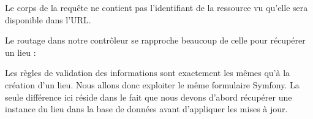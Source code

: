 \documentclass[big]{zmdocument}
\begin{document}
\begin{Error}
Le corps de la requête ne contient pas l'identifiant de la ressource vu qu'elle sera disponible dans l'URL.
\end{Error}


Le routage dans notre contrôleur se rapproche beaucoup de celle pour récupérer un lieu :






Les règles de validation des informations sont exactement les mêmes qu'à la création d'un lieu. Nous allons donc exploiter le même formulaire Symfony.
La seule différence ici réside dans le fait que nous devons d'abord récupérer une instance du lieu dans la base de données avant d'appliquer les mises à jour.
\end{document}
